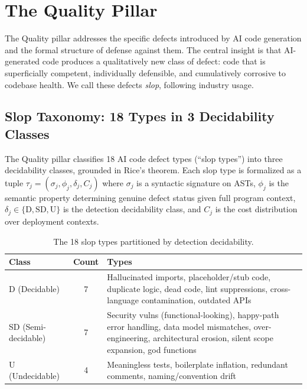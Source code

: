 \section{The Quality Pillar}
\label{sec:quality}

The Quality pillar \citep{pillar-quality} addresses the specific defects introduced by AI code generation and the formal structure of defense against them. The central insight is that AI-generated code produces a qualitatively new class of defect: code that is superficially competent, individually defensible, and cumulatively corrosive to codebase health. We call these defects \emph{slop}, following industry usage.

\subsection{Slop Taxonomy: 18 Types in 3 Decidability Classes}

The Quality pillar classifies 18 AI code defect types (``slop types'') into three decidability classes, grounded in Rice's theorem. Each slop type is formalized as a tuple $\tau_j = (\sigma_j, \phi_j, \delta_j, C_j)$ where $\sigma_j$ is a syntactic signature on ASTs, $\phi_j$ is the semantic property determining genuine defect status given full program context, $\delta_j \in \{\mathrm{D}, \mathrm{SD}, \mathrm{U}\}$ is the detection decidability class, and $C_j$ is the cost distribution over deployment contexts.

\begin{table}[htbp]
\centering
\caption{The 18 slop types partitioned by detection decidability.}
\label{tab:slop-partition}
\small
\begin{tabularx}{\textwidth}{l c X}
\toprule
\textbf{Class} & \textbf{Count} & \textbf{Types} \\
\midrule
D (Decidable) & 7 & Hallucinated imports, placeholder/stub code, duplicate logic, dead code, lint suppressions, cross-language contamination, outdated APIs \\
\addlinespace
SD (Semi-decidable) & 7 & Security vulns (functional-looking), happy-path error handling, data model mismatches, over-engineering, architectural erosion, silent scope expansion, god functions \\
\addlinespace
U (Undecidable) & 4 & Meaningless tests, boilerplate inflation, redundant comments, naming/convention drift \\
\bottomrule
\end{tabularx}
\end{table}

